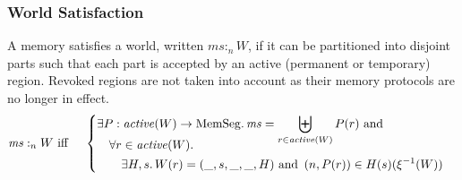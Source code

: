\documentclass[format=acmsmall, review=false, screen=true]{acmart}
\newcommand{\var}[1]{\mathit{#1}}
\newcommand{\hs}{\var{ms}}
\newcommand{\ms}{\hs}
\newcommand{\heap}{\var{mem}}
\newcommand{\plainfun}[2]{
  \ifthenelse{\equal{#2}{}}
  {\mathit{#1}}
  {\mathit{#1}(#2)}
}
\newcommand{\activeReg}[1]{\plainfun{active}{#1}}
\newcommand{\heapSat}[3][\heap]{#1 :_{#2} #3}
\newcommand{\memSat}[3][n]{\heapSat[#2]{#1}{#3}}
\newcommand{\plaindom}[1]{\mathrm{#1}}
\newcommand{\HeapSegments}{\plaindom{MemSeg}}
\newcommand{\npair}[2][n]{\left(#1,#2 \right)}
\begin{document}

\subsubsection{World Satisfaction}
A memory satisfies a world, written $\memSat{\ms}{W}$, if it can be partitioned
into disjoint parts such that each part is accepted by an active (permanent or
temporary) region.  Revoked regions are not taken into account as their memory protocols are no longer in effect.
\begin{align*}
  &\memSat{\ms}{W}
    \text{ iff }\quad \left\{\begin{aligned}
        &\exists P : \activeReg{W} \rightarrow \HeapSegments \ldotp \hs = \biguplus_{r\in\activeReg{W}}P(r) \text{ and } \\[-.35cm]
        &\quad \forall r \in \activeReg{W} \ldotp\\
        &\quad \quad \exists H,s \ldotp W(r) = (\_,s,\_,\_,H) \text{ and } \npair[n]{P(r)} \in H(s)(\xi^{-1}(W))\\
      \end{aligned}\right.
\end{align*}
\end{document}
